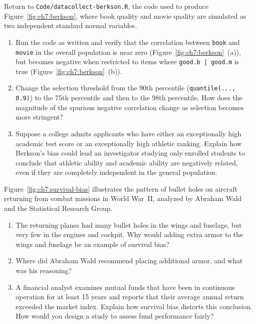 \begin{exercise}
  Return to \lstinline{Code/datacollect-berkson.R}, the code used to produce
  Figure~\ref{fig:ch7:berkson}, where book quality and movie quality are
  simulated as two independent standard normal variables.
  \begin{enumerate}
  \item Run the code as written and verify that the correlation between
    \lstinline{book} and \lstinline{movie} in the overall population is near
    zero (Figure~\ref{fig:ch7:berkson}~(a)), but becomes negative when
    restricted to items where \lstinline{good.b | good.m} is true
    (Figure~\ref{fig:ch7:berkson}~(b)).
  \item Change the selection threshold from the 90th percentile
    (\lstinline{quantile(..., 0.9)}) to the 75th percentile and then to the 98th
    percentile. How does the magnitude of the spurious negative correlation
    change as selection becomes more stringent?
  \item Suppose a college admits applicants who have either an exceptionally
    high academic test score or an exceptionally high athletic ranking.  Explain
    how Berkson's bias could lead an investigator studying only enrolled
    students to conclude that athletic ability and academic ability are
    negatively related, even if they are completely independent in the general
    population.
  \end{enumerate}
\end{exercise}

\begin{exercise}
  Figure~\ref{fig:ch7:survival-bias} illustrates the pattern of bullet holes on
  aircraft returning from combat missions in World War~II, analyzed by Abraham
  Wald and the Statistical Research Group.
  \begin{enumerate}
  \item The returning planes had many bullet holes in the wings and fuselage,
    but very few in the engines and cockpit. Why would adding extra armor to the
    wings and fuselage be an example of survival bias?
  \item Where did Abraham Wald recommend placing additional armor, and what was
    his reasoning?
  \item A financial analyst examines mutual funds that have been in continuous
    operation for at least 15 years and reports that their average annual return
    exceeded the market index. Explain how survival bias distorts this
    conclusion. How would you design a study to assess fund performance fairly?
  \end{enumerate}
\end{exercise}


